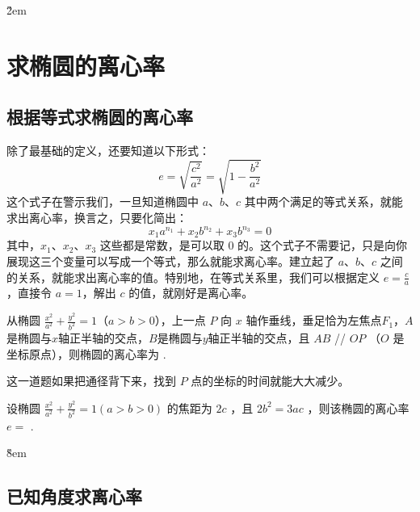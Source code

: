 \v{2em}

\section{求椭圆的离心率}

\subsection{根据等式求椭圆的离心率}

\begin{theorem}
    除了最基础的定义，还要知道以下形式：
    $$ e = \sqrt{\frac{c^2}{a^2}} = \sqrt{1 - \frac{b^2}{a^2}} $$
    这个式子在警示我们，一旦知道椭圆中 $a$、$b$、$c$ 其中两个满足的等式关系，就能求出离心率，换言之，只要化简出：
    $$
        x_1a^{n_1} + x_2b^{n_2} + x_3b^{n_3} = 0
    $$
    其中，$x_1$、$x_2$、$x_3$ 这些都是常数，是可以取 $0$ 的。这个式子不需要记，只是向你展现这三个变量可以写成一个等式，那么就能求离心率。建立起了 $a$、$b$、$c$ 之间的关系，就能求出离心率的值。特别地，在等式关系里，我们可以根据定义 $e = \frac{c}{a}$，直接令 $a=1$，解出 $c$ 的值，就刚好是离心率。
\end{theorem}

\vspace{1em}

\begin{example}
    从椭圆 \(\frac{x^2}{a^2} + \frac{y^2}{b^2} = 1\)（\(a > b > 0\)），上一点 $P$ 向 $x$ 轴作垂线，垂足恰为左焦点\(F_1\)，\(A\)是椭圆与$x$轴正半轴的交点，\(B\)是椭圆与$y$轴正半轴的交点，且 \(AB\) // \(OP\) （$O$ 是坐标原点），则椭圆的离心率为 \underline{\hspace{1.5cm}}.
\end{example}

\begin{tips}
    这一道题如果把通径背下来，找到 $P$ 点的坐标的时间就能大大减少。
\end{tips}

\vspace{8em}

\begin{example}
    设椭圆 $\frac{x^2}{a^2}+\frac{y^2}{b^2}=1(a>b>0)$ 的焦距为 $2 c$ ，且 $2 b^2=3 a c$ ，则该椭圆的离心率 $e=$ \underline{\qquad}.
\end{example}

\v{8em}

\subsection{已知角度求离心率}

